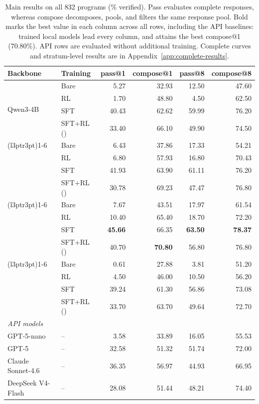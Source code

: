 \begin{table}[!t]
\centering
\small
\renewcommand{\arraystretch}{0.94}
\setlength{\tabcolsep}{6.0pt}
\begin{tabular}{llrrrr}
\toprule
\rowcolor{algobg}
Backbone & Training & pass@1 & compose@1 & pass@8 & compose@8 \\
\midrule
\multirow{4}{*}{Qwen3-4B}
 & Bare   & 5.27 & 32.93 & 12.50 & 47.60 \\
 & RL     & 1.70 & 48.80 & 4.50 & 62.50 \\
 & SFT    & 40.43 & 62.62 & 59.99 & 76.20 \\
 & SFT+RL (\sam{}) & 33.40 & 66.10 & 49.90 & 74.50 \\
\cmidrule(l{3pt}r{3pt}){1-6}
\multirow{4}{*}{Qwen3-8B}
 & Bare   & 6.43 & 37.86 & 17.33 & 54.21 \\
 & RL     & 6.80 & 57.93 & 16.80 & 70.43 \\
 & SFT    & 41.93 & 63.90 & 61.11 & 76.20 \\
 & SFT+RL (\sam{}) & 30.78 & 69.23 & 47.47 & 76.80 \\
\cmidrule(l{3pt}r{3pt}){1-6}
\multirow{4}{*}{Qwen3-14B}
 & Bare   & 7.67 & 43.51 & 17.97 & 61.54 \\
 & RL     & 10.40 & 65.40 & 18.70 & 72.20 \\
 & SFT    & \textbf{45.66} & 66.35 & \textbf{63.50} & \textbf{78.37} \\
 & SFT+RL (\sam{}) & 40.70 & \textbf{70.80} & 56.80 & 76.80 \\
\cmidrule(l{3pt}r{3pt}){1-6}
\multirow{4}{*}{Llama 3.1-8B}
 & Bare   & 0.61 & 27.88 & 3.81 & 51.20 \\
 & RL     & 4.50 & 46.00 & 10.50 & 56.20 \\
 & SFT    & 39.24 & 61.30 & 56.86 & 73.08 \\
 & SFT+RL (\sam{}) & 33.70 & 63.70 & 49.64 & 72.70 \\
\midrule
\multicolumn{6}{l}{\textit{API models}} \\
GPT-5-nano       & -- & 3.58  & 33.89 & 16.05 & 55.53 \\
GPT-5            & -- & 32.58 & 51.32 & 51.74 & 72.00 \\
Claude Sonnet-4.6 & -- & 36.35 & 56.97 & 44.93 & 66.95 \\
DeepSeek V4-Flash & -- & 28.08 & 51.44 & 48.21 & 74.40 \\
\bottomrule
\end{tabular}
\caption{Main results on all 832 programs (\% verified).  Pass evaluates
complete responses, whereas compose decomposes, pools, and filters the same
response pool.  Bold marks the best value in each column across all rows, including the API
baselines: trained local models lead every column, and \sam{} attains the
best compose@1 (70.80\%).  API rows are evaluated without additional
training.  Complete curves and stratum-level results are in
Appendix~\ref{app:complete-results}.}
\label{tab:rcf-paired}
\end{table}

